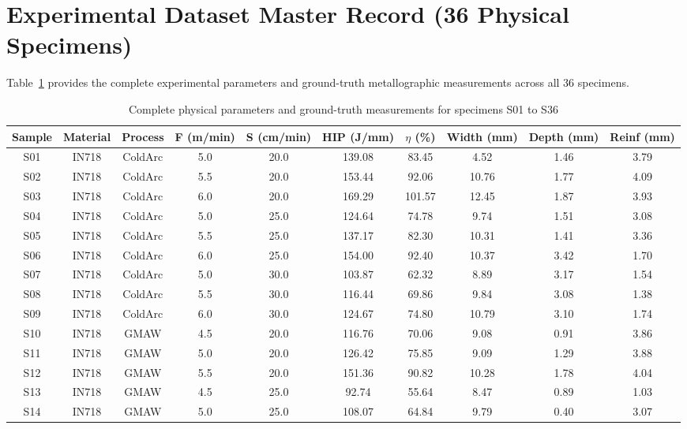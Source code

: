 \documentclass[12pt,a4paper,oneside]{report}
\begin{document}
\section{Experimental Dataset Master Record (36 Physical Specimens)}
Table~\ref{tab:app_full_dataset} provides the complete experimental parameters and ground-truth metallographic measurements across all 36 specimens.

\begin{table}[htbp]\centering
\caption{Complete physical parameters and ground-truth measurements for specimens S01 to S36}\label{tab:app_full_dataset}
\scriptsize
\renewcommand{\arraystretch}{1.1}
\begin{tabular}{@{}cccccccccc@{}}
\toprule
\textbf{Sample} & \textbf{Material} & \textbf{Process} & \textbf{F (m/min)} & \textbf{S (cm/min)} & \textbf{HIP (J/mm)} & \textbf{$\eta$ (\%)} & \textbf{Width (mm)} & \textbf{Depth (mm)} & \textbf{Reinf (mm)}\\ \midrule
S01 & IN718 & ColdArc & 5.0 & 20.0 & 139.08 & 83.45 & 4.52 & 1.46 & 3.79\\
S02 & IN718 & ColdArc & 5.5 & 20.0 & 153.44 & 92.06 & 10.76 & 1.77 & 4.09\\
S03 & IN718 & ColdArc & 6.0 & 20.0 & 169.29 & 101.57 & 12.45 & 1.87 & 3.93\\
S04 & IN718 & ColdArc & 5.0 & 25.0 & 124.64 & 74.78 & 9.74 & 1.51 & 3.08\\
S05 & IN718 & ColdArc & 5.5 & 25.0 & 137.17 & 82.30 & 10.31 & 1.41 & 3.36\\
S06 & IN718 & ColdArc & 6.0 & 25.0 & 154.00 & 92.40 & 10.37 & 3.42 & 1.70\\
S07 & IN718 & ColdArc & 5.0 & 30.0 & 103.87 & 62.32 & 8.89 & 3.17 & 1.54\\
S08 & IN718 & ColdArc & 5.5 & 30.0 & 116.44 & 69.86 & 9.84 & 3.08 & 1.38\\
S09 & IN718 & ColdArc & 6.0 & 30.0 & 124.67 & 74.80 & 10.79 & 3.10 & 1.74\\
S10 & IN718 & GMAW    & 4.5 & 20.0 & 116.76 & 70.06 & 9.08 & 0.91 & 3.86\\
S11 & IN718 & GMAW    & 5.0 & 20.0 & 126.42 & 75.85 & 9.09 & 1.29 & 3.88\\
S12 & IN718 & GMAW    & 5.5 & 20.0 & 151.36 & 90.82 & 10.28 & 1.78 & 4.04\\
S13 & IN718 & GMAW    & 4.5 & 25.0 & 92.74  & 55.64 & 8.47 & 0.89 & 1.03\\
S14 & IN718 & GMAW    & 5.0 & 25.0 & 108.07 & 64.84 & 9.79 & 0.40 & 3.07\\

\end{tabular}
\end{table}
\end{document}
